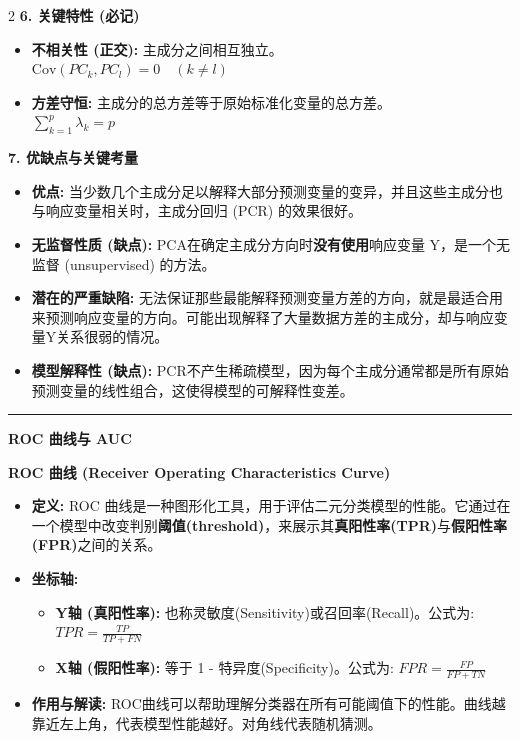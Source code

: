 \documentclass[9pt,a4paper]{article} %
\newcommand{\mysection}[1]{\vspace{0.5em}\hrule\vspace{0.3em}\noindent\textbf{\large #1}\vspace{0.1em}}
\begin{document}
\begin{multicols}{2}
\textbf{6. 关键特性 (必记)}
\begin{itemize}
    \item \textbf{不相关性 (正交):} 主成分之间相互独立。\\ $\text{Cov}(PC_k, PC_l) = 0 \quad (k \neq l)$
    \item \textbf{方差守恒:} 主成分的总方差等于原始标准化变量的总方差。\\ $\sum_{k=1}^{p} \lambda_k = p$
\end{itemize}

\textbf{7. 优缺点与关键考量}
\begin{itemize}
    \item \textbf{优点:} 当少数几个主成分足以解释大部分预测变量的变异，并且这些主成分也与响应变量相关时，主成分回归 (PCR) 的效果很好。
    \item \textbf{无监督性质 (缺点):} PCA在确定主成分方向时\textbf{没有使用}响应变量 Y，是一个无监督 (unsupervised) 的方法。
    \item \textbf{潜在的严重缺陷:} 无法保证那些最能解释预测变量方差的方向，就是最适合用来预测响应变量的方向。可能出现解释了大量数据方差的主成分，却与响应变量Y关系很弱的情况。
    \item \textbf{模型解释性 (缺点):} PCR不产生稀疏模型，因为每个主成分通常都是所有原始预测变量的线性组合，这使得模型的可解释性变差。
\end{itemize}






\mysection{ROC 曲线与 AUC}

\textbf{ROC 曲线 (Receiver Operating Characteristics Curve)}
\begin{itemize}
    \item \textbf{定义:} ROC 曲线是一种图形化工具，用于评估二元分类模型的性能。它通过在一个模型中改变判别\textbf{阈值(threshold)}，来展示其\textbf{真阳性率(TPR)}与\textbf{假阳性率(FPR)}之间的关系。
    \item \textbf{坐标轴:}
        \begin{itemize}
            \item \textbf{Y轴 (真阳性率):} 也称灵敏度(Sensitivity)或召回率(Recall)。公式为: $TPR = \frac{TP}{TP+FN}$
            \item \textbf{X轴 (假阳性率):} 等于 1 - 特异度(Specificity)。公式为: $FPR = \frac{FP}{FP+TN}$
        \end{itemize}
    \item \textbf{作用与解读:} ROC曲线可以帮助理解分类器在所有可能阈值下的性能。曲线越靠近左上角，代表模型性能越好。对角线代表随机猜测。
\end{itemize}


\end{multicols}
\end{document}
